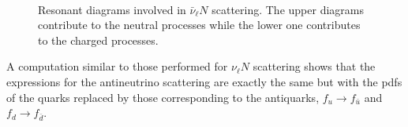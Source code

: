 \documentclass[aps,preprint,tightenlines,floatfix,superscriptaddress,nofootinbib,showpacs]{revtex4-1}
\begin{document}
\begin{center}
\begin{figure}[H]
\centering
\hspace*{0.2\textwidth}
\\
\caption{Resonant diagrams involved in $\bar{\nu}_{\ell}N$ scattering. The upper diagrams contribute to the neutral processes while the lower one contributes to the charged processes.}
\label{fig6}
\end{figure}
\end{center}
\par
A computation similar to those performed for $\nu_{\ell}N$ scattering shows that the expressions for the antineutrino scattering are exactly the same but with the pdfs of the quarks replaced by those corresponding to the antiquarks, $f_u\to f_{\bar{u}}$ and $f_d\to f_{\bar{d}}$.
\end{document}
